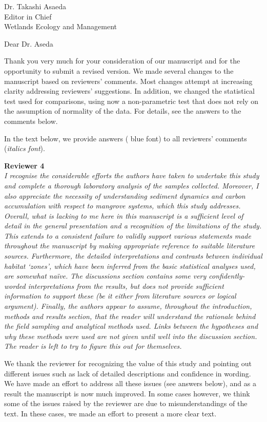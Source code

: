 \documentclass[11pt]{bgcletter}
\begin{document}
\begin{letter}{Dr. Takashi Asaeda\\
 Editor in Chief \\ Wetlands Ecology and Management}

\opening{Dear Dr. Aseda}
Thank you very much for your consideration of our manuscript and for the opportunity to submit a revised version. We made several changes to the manuscript based on reviewers' comments. Most changes attempt at increasing clarity addressing reviewers' suggestions. In addition, we changed the statistical test used for comparisons, using now a non-parametric test that does not rely on the assumption of normality of the data. For details, see the answers to the comments below. 

 In the text below, we provide answers ({\color{blue} blue font}) to all reviewers' comments ({\it italics font}). 

{\bf Reviewer 4} \\

{\it I recognise the considerable efforts the authors have taken to undertake this study and complete a thorough laboratory analysis of the samples collected. Moreover, I also appreciate the necessity of understanding sediment dynamics and carbon accumulation with respect to mangrove systems, which this study addresses. Overall, what is lacking to me here in this manuscript is a sufficient level of detail in the general presentation and a recognition of the limitations of the study. This extends to a consistent failure to validly support various statements made throughout the manuscript by making appropriate reference to suitable literature sources. Furthermore, the detailed interpretations and contrasts between individual habitat `zones', which have been inferred from the basic statistical analyses used, are somewhat na\"ive.  The discussions section contains some very confidently-worded interpretations from the results, but does not provide sufficient information to support these
(be it either from literature sources or logical argument).  Finally, the authors appear to assume, throughout the introduction, methods and results section, that the reader will understand the rationale behind the field sampling and analytical methods used. Links between the hypotheses and why these methods were used are not given until well into the discussion section. The reader is left to try to figure this out for themselves.}

{\color{blue} We thank the reviewer for recognizing the value of this study and pointing out different issues such as lack of detailed descriptions and confidence in wording. We have made an effort to address all these issues (see answers below), and as a result the manuscript is now much improved. In some cases however, we think some of the issues raised by the reviewer are due to misunderstandings of the text. In these cases, we made an effort to present a more clear text. }


\end{letter}
\end{document}
